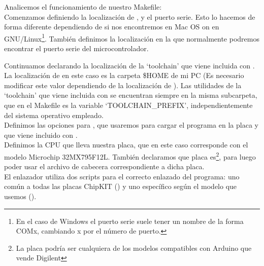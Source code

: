 

 Analicemos el funcionamiento de nuestro Makefile:\\

 Comenzamos definiendo la localización de ,  y el puerto serie. Esto lo hacemos de forma diferente dependiendo de si nos encontremos en Mac OS on en GNU/Linux\protect\footnote{En el caso de Windows el puerto serie suele tener un nombre de la forma COMx, cambiando x por el número de puerto.}. También definimos la localización en la que normalmente podremos encontrar el puerto serie del microcontrolador.
 

 Continuamos declarando la localización de la `toolchain' que viene incluida con . La localización de  en este caso es la carpeta \$HOME de mi PC (Es necesario modificar este valor dependiendo de la localización de ). Las utilidades de la `toolchain' que viene incluida con  se encuentran siempre en la misma subcarpeta, que en el Makefile es la variable `TOOLCHAIN\_PREFIX', independientemente del sistema operativo empleado.\\ 
 
 
 Definimos las opciones para , que usaremos para cargar el programa en la placa y que viene incluido con .\\
 
 
 Definimos la CPU que lleva nuestra placa, que en este caso corresponde con el modelo Microchip 32MX795F12L. También declaramos que placa es\protect\footnote{La placa podría ser cualquiera de los modelos compatibles con Arduino que vende Digilent}, para luego poder usar el archivo de cabecera correspondiente a dicha placa.\\
 
 
 El enlazador utiliza dos scripts para el correcto enlazado del programa: uno común a todas las placas ChipKIT () y uno específico según el modelo que usemos ().
 
